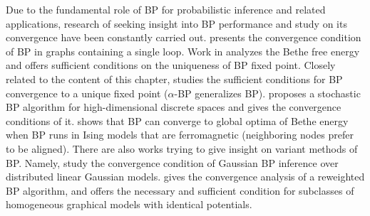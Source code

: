 Due to the fundamental role of BP for probabilistic inference and related applications, research of seeking insight into BP performance and study on its convergence have been constantly carried out. \cite{weiss2000correctness} presents the convergence condition of BP in graphs containing a single loop. Work in \cite{heskes2004uniqueness} analyzes the Bethe free energy and offers sufficient conditions on the uniqueness of BP fixed point.
{Closely related to the content of this chapter, \cite{mooij2012sufficient-conditions} studies the sufficient conditions for BP convergence to a unique fixed point ($\alpha$-BP generalizes BP).}
\cite{nima2013stochasticBP} proposes a stochastic BP algorithm for high-dimensional discrete spaces and gives the convergence conditions of it. \cite{frederic2019fast} shows that BP can converge to global optima of Bethe energy when BP runs in Ising models that are ferromagnetic (neighboring nodes prefer to be aligned).
There are also works trying to give insight on variant methods of BP. Namely,
\cite{du2017convergenceBP, malioutov2006walk-sums} study the convergence condition of Gaussian BP inference over distributed linear Gaussian models. \cite{roosta2008reweighed_sum_product} gives the convergence analysis of a reweighted BP algorithm, and offers the necessary and sufficient condition for subclasses of homogeneous graphical models with identical potentials.



